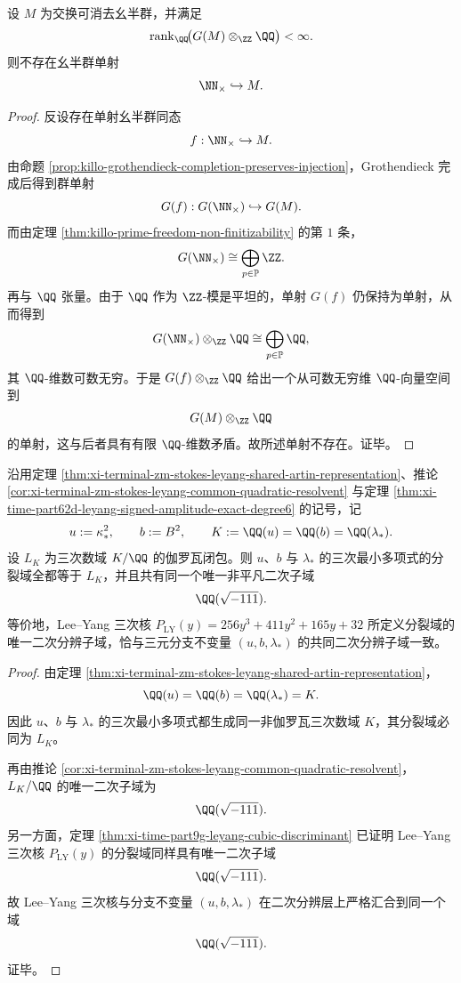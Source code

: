 \begin{theorem}\label{thm:xi-time-part62ca-no-multiplicative-embedding-into-finite-grothendieck-rank}
设 \(M\) 为交换可消去幺半群，并满足
\[
\operatorname{rank}_{\QQ}\!\bigl(G(M)\otimes_{\ZZ}\QQ\bigr)<\infty.
\]
则不存在幺半群单射
\[
\NN_{\times}\hookrightarrow M.
\]
\end{theorem}
\begin{proof}
反设存在单射幺半群同态
\[
f:\NN_{\times}\hookrightarrow M.
\]
由命题 \ref{prop:killo-grothendieck-completion-preserves-injection}，Grothendieck 完成后得到群单射
\[
G(f):G(\NN_{\times})\hookrightarrow G(M).
\]
而由定理 \ref{thm:killo-prime-freedom-non-finitizability} 的第 \(1\) 条，
\[
G(\NN_{\times})\cong \bigoplus_{p\in\mathbb P}\ZZ.
\]
再与 \(\QQ\) 张量。由于 \(\QQ\) 作为 \(\ZZ\)-模是平坦的，单射 \(G(f)\) 仍保持为单射，从而得到
\[
G(\NN_{\times})\otimes_{\ZZ}\QQ
\cong
\bigoplus_{p\in\mathbb P}\QQ,
\]
其 \(\QQ\)-维数可数无穷。于是 \(G(f)\otimes_{\ZZ}\QQ\) 给出一个从可数无穷维 \(\QQ\)-向量空间到
\[
G(M)\otimes_{\ZZ}\QQ
\]
的单射，这与后者具有有限 \(\QQ\)-维数矛盾。故所述单射不存在。证毕。
\end{proof}

\begin{theorem}\label{thm:xi-time-part62ca-leyang-branch-invariants-common-quadratic-resolvent}
沿用定理 \ref{thm:xi-terminal-zm-stokes-leyang-shared-artin-representation}、推论 \ref{cor:xi-terminal-zm-stokes-leyang-common-quadratic-resolvent} 与定理 \ref{thm:xi-time-part62d-leyang-signed-amplitude-exact-degree6} 的记号，记
\[
u:=\kappa_*^2,
\qquad
b:=B^2,
\qquad
K:=\QQ(u)=\QQ(b)=\QQ(\lambda_*).
\]
设 \(L_K\) 为三次数域 \(K/\QQ\) 的伽罗瓦闭包。则 \(u\)、\(b\) 与 \(\lambda_*\) 的三次最小多项式的分裂域全都等于 \(L_K\)，并且共有同一个唯一非平凡二次子域
\[
\QQ(\sqrt{-111}).
\]
等价地，Lee--Yang 三次核 \(P_{\mathrm{LY}}(y)=256y^3+411y^2+165y+32\) 所定义分裂域的唯一二次分辨子域，恰与三元分支不变量 \((u,b,\lambda_*)\) 的共同二次分辨子域一致。
\end{theorem}
\begin{proof}
由定理 \ref{thm:xi-terminal-zm-stokes-leyang-shared-artin-representation}，
\[
\QQ(u)=\QQ(b)=\QQ(\lambda_*)=K.
\]
因此 \(u\)、\(b\) 与 \(\lambda_*\) 的三次最小多项式都生成同一非伽罗瓦三次数域 \(K\)，其分裂域必同为 \(L_K\)。

再由推论 \ref{cor:xi-terminal-zm-stokes-leyang-common-quadratic-resolvent}，\(L_K/\QQ\) 的唯一二次子域为
\[
\QQ(\sqrt{-111}).
\]
另一方面，定理 \ref{thm:xi-time-part9g-leyang-cubic-discriminant} 已证明 Lee--Yang 三次核 \(P_{\mathrm{LY}}(y)\) 的分裂域同样具有唯一二次子域
\[
\QQ(\sqrt{-111}).
\]
故 Lee--Yang 三次核与分支不变量 \((u,b,\lambda_*)\) 在二次分辨层上严格汇合到同一个域
\[
\QQ(\sqrt{-111}).
\]
证毕。
\end{proof}
